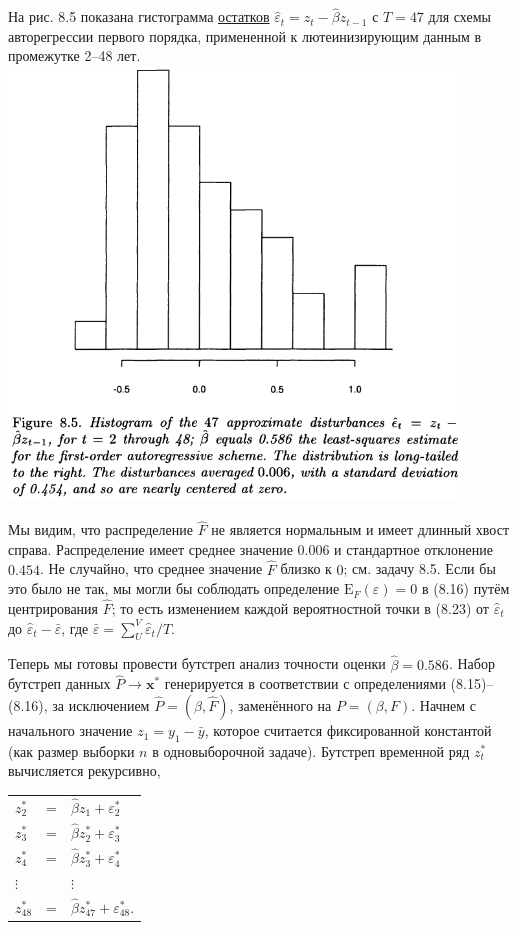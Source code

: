 \documentclass{report}
\begin{document}
На рис. 8.5 показана гистограмма \underline{остатков} $\hat{\varepsilon}_t = z_t - \hat{\beta} z_{t-1}$ с $T = 47$ для схемы авторегрессии первого порядка, примененной к лютеинизирующим данным в промежутке 2--48 лет.\\
\includegraphics[width=12cm]{fig85}

Мы видим, что распределение $\hat{F}$ не является нормальным и имеет длинный хвост справа. Распределение имеет среднее значение $0.006$ и стандартное отклонение $0.454$. Не случайно, что среднее значение $\hat{F}$ близко к $0$; см. задачу 8.5. Если бы это было не так, мы могли бы соблюдать определение $\text{E}_F(\varepsilon) = 0$ в (8.16) путём центрирования $\hat{F}$; то есть изменением каждой вероятностной точки в (8.23) от $\hat{\varepsilon}_t$ до $\hat{\varepsilon}_t - \bar{\varepsilon}$, где $\bar{\varepsilon} = \sum_{U}^{V} \hat{\varepsilon}_t/T$.

Теперь мы готовы провести бутстреп анализ точности оценки $\hat{\beta} = 0.586$. Набор бутстреп данных $\hat{P} \to \textbf{x}^*$ генерируется в соответствии с определениями (8.15)--(8.16), за исключением $\hat{P} = (\hat{\beta}, \hat{F})$, заменённого на $P = (\beta, F)$. Начнем с начального значение $z_1 = y_1 - \bar{y}$, которое считается фиксированной константой (как размер выборки $n$ в одновыборочной задаче). Бутстреп временной ряд $z_t^*$ вычисляется рекурсивно,

\begin{tabular}{ l l l }
	$z_2^*$ & = & $\hat{\beta} z_1 + \varepsilon_2^*$ \\
	$z_3^*$ & = & $\hat{\beta} z_2^* + \varepsilon_3^*$ \\
	$z_4^*$ & = & $\hat{\beta} z_3^* + \varepsilon_4^*$\\
	$\vdots$ & & $\vdots$\\
	$z_{48}^*$ & = & $\hat{\beta} z_{47}^* + \varepsilon_{48}^*.$\\
\end{tabular}
\end{document}
